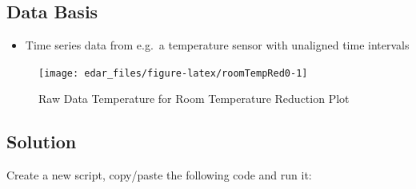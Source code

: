 \documentclass[
  a4paperpaper,
]{book}
\providecommand{\tightlist}{%
  \setlength{\itemsep}{0pt}\setlength{\parskip}{0pt}}
\begin{document}
\hypertarget{data-basis-17}{%
\subsection{Data Basis}\label{data-basis-17}}

\begin{itemize}
\tightlist
\item
  Time series data from e.g.~a temperature sensor with unaligned time intervals
\end{itemize}

\begin{figure}
\texttt{[image: edar\_files/figure-latex/roomTempRed0-1]} \caption{Raw Data Temperature for Room Temperature Reduction Plot}\label{fig:roomTempRed0}
\end{figure}

\newpage

\hypertarget{solution-17}{%
\subsection{Solution}\label{solution-17}}

Create a new script, copy/paste the following code and run it:
\end{document}
